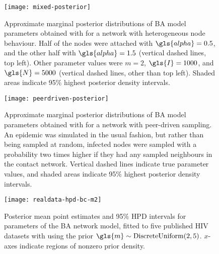 \begin{figure}[ht]
    \centering
    \texttt{[image: mixed-posterior]}
    \caption[
        Approximate marginal posterior distributions of \gls{BA} model
        parameters obtained with  for a network with
        heterogeneous node behaviour.
    ]{
        Approximate marginal posterior distributions of \gls{BA} model
        parameters obtained with  for a network with
        heterogeneous node behaviour. Half of the nodes were attached with
        $\gls{alpha} = 0.5$, and the other half with $\gls{alpha} = 1.5$
        (vertical dashed lines, top left). Other parameter values were $m = 2$,
        $\gls{I} = 1000$, and $\gls{N} = 5000$ (vertical dashed lines, other
        than top left). Shaded areas indicate 95\% highest posterior density
        intervals.
    }
    \label{fig:mixed}
\end{figure}

\begin{figure}[ht]
    \centering
    \texttt{[image: peerdriven-posterior]}
    \caption[
        Approximate marginal posterior distributions of \gls{BA}
        model parameters obtained with  for a network with
        peer-driven sampling.
    ]{
        Approximate marginal posterior distributions of \gls{BA}
        model parameters obtained with  for a network with
        peer-driven sampling. An epidemic was simulated in the usual fashion,
        but rather than being sampled at random, infected nodes were sampled
        with a probability two times higher if they had any sampled neighbours
        in the contact network. Vertical dashed lines indicate true parameter
        values, and shaded areas indicate 95\% highest posterior density
        intervals.
    }
    \label{fig:peerdriven}
\end{figure}

\begin{figure}[ht]
    \texttt{[image: realdata-hpd-bc-m2]}
    \caption[
        Posterior mean point estimates and 95\% \gls{HPD} intervals for
        parameters of the \gls{BA} network model, fitted to eleven \gls{HIV}
        datasets with  using the prior $\gls{m} \sim
        \DiscreteUniform(2, 5)$.
    ]{
        Posterior mean point estimates and 95\% \gls{HPD} intervals for
        parameters of the \gls{BA} network model, fitted to five published
        \gls{HIV} datasets with  using the prior $\gls{m}
        \sim \DiscreteUniform(2, 5)$. $x$-axes indicate regions of nonzero
        prior density. 
    }
    \label{fig:abchpdm2}
\end{figure}

